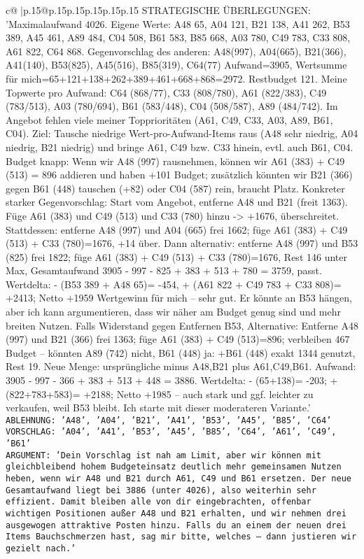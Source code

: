 \documentclass{article}
\begin{document}
{\begin{supertabular}{c@{$\;$}|p{.15\linewidth}@{}p{.15\linewidth}p{.15\linewidth}p{.15\linewidth}p{.15\linewidth}p{.15\linewidth}}
{{{	 STRATEGISCHE ÜBERLEGUNGEN: {'Maximalaufwand 4026. Eigene Werte: A48 65, A04 121, B21 138, A41 262, B53 389, A45 461, A89 484, C04 508, B61 583, B85 668, A03 780, C49 783, C33 808, A61 822, C64 868. Gegenvorschlag des anderen: {A48(997), A04(665), B21(366), A41(140), B53(825), A45(516), B85(319), C64(77)} Aufwand=3905, Wertsumme für mich=65+121+138+262+389+461+668+868=2972. Restbudget 121. Meine Topwerte pro Aufwand: C64 (868/77), C33 (808/780), A61 (822/383), C49 (783/513), A03 (780/694), B61 (583/448), C04 (508/587), A89 (484/742). Im Angebot fehlen viele meiner Topprioritäten (A61, C49, C33, A03, A89, B61, C04). Ziel: Tausche niedrige Wert-pro-Aufwand-Items raus (A48 sehr niedrig, A04 niedrig, B21 niedrig) und bringe A61, C49 bzw. C33 hinein, evtl. auch B61, C04. Budget knapp: Wenn wir A48 (997) rausnehmen, können wir A61 (383) + C49 (513) = 896 addieren und haben +101 Budget; zusätzlich könnten wir B21 (366) gegen B61 (448) tauschen (+82) oder C04 (587) rein, braucht Platz. Konkreter starker Gegenvorschlag: Start vom Angebot, entferne A48 und B21 (freit 1363). Füge A61 (383) und C49 (513) und C33 (780) hinzu -> +1676, überschreitet. Stattdessen: entferne A48 (997) und A04 (665) frei 1662; füge A61 (383) + C49 (513) + C33 (780)=1676, +14 über. Dann alternativ: entferne A48 (997) und B53 (825) frei 1822; füge A61 (383) + C49 (513) + C33 (780)=1676, Rest 146 unter Max, Gesamtaufwand 3905 - 997 - 825 + 383 + 513 + 780 = 3759, passt. Wertdelta: - (B53 389 + A48 65)= -454, + (A61 822 + C49 783 + C33 808)= +2413; Netto +1959 Wertgewinn für mich – sehr gut. Er könnte an B53 hängen, aber ich kann argumentieren, dass wir näher am Budget genug sind und mehr breiten Nutzen. Falls Widerstand gegen Entfernen B53, Alternative: Entferne A48 (997) und B21 (366) frei 1363; füge A61 (383) + C49 (513)=896; verbleiben 467 Budget – könnten A89 (742) nicht, B61 (448) ja: +B61 (448) exakt 1344 genutzt, Rest 19. Neue Menge: ursprüngliche minus {A48,B21} plus {A61,C49,B61}. Aufwand: 3905 - 997 - 366 + 383 + 513 + 448 = 3886. Wertdelta: - (65+138)= -203; + (822+783+583)= +2188; Netto +1985 – auch stark und ggf. leichter zu verkaufen, weil B53 bleibt. Ich starte mit dieser moderateren Variante.'}\\ \tt ABLEHNUNG: {'A48', 'A04', 'B21', 'A41', 'B53', 'A45', 'B85', 'C64'}\\ \tt VORSCHLAG: {'A04', 'A41', 'B53', 'A45', 'B85', 'C64', 'A61', 'C49', 'B61'}\\ \tt ARGUMENT: {'Dein Vorschlag ist nah am Limit, aber wir können mit gleichbleibend hohem Budgeteinsatz deutlich mehr gemeinsamen Nutzen heben, wenn wir A48 und B21 durch A61, C49 und B61 ersetzen. Der neue Gesamtaufwand liegt bei 3886 (unter 4026), also weiterhin sehr effizient. Damit bleiben alle von dir eingebrachten, offenbar wichtigen Positionen außer A48 und B21 erhalten, und wir nehmen drei ausgewogen attraktive Posten hinzu. Falls du an einem der neuen drei Items Bauchschmerzen hast, sag mir bitte, welches – dann justieren wir gezielt nach.'} 
	  } 
	   } 
	   } 
	  \\ 
 


\end{supertabular}}
\end{document}
